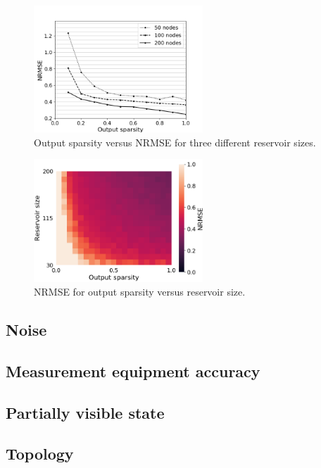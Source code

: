 \begin{figure}[H]
  \centering
  \includegraphics[width=2.5in]{img/output_sparsity_all.png}
  \caption{
    Output sparsity versus NRMSE for three different reservoir sizes.
  }
  \label{performance}
\end{figure}

\begin{figure}[H]
  \centering
  \includegraphics[width=2.5in]{img/reservoir_size_output_sparsity.png}
  \caption{
    NRMSE for output sparsity versus reservoir size.
  }
  \label{performance}
\end{figure}

\subsection{Noise}

\subsection{Measurement equipment accuracy}

\subsection{Partially visible state}

\subsection{Topology}



